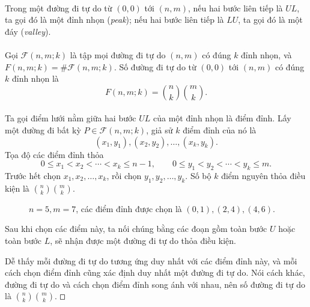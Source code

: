 \documentclass[11pt]{article}
\newcommand{\square}{\mathord{\vcenter{\hrule height .5pt
  \hbox{\vrule width .5pt height 5pt\kern5pt\vrule width .5pt}
  \hrule height .5pt}}}
\begin{document}
\paragraph{}
Trong một đường đi tự do từ \((0,0)\) tới \((n,m)\), nếu hai bước liên tiếp là
\(UL\), ta gọi đó là một đỉnh nhọn (\emph{peak}); nếu hai bước liên tiếp là
\(LU\), ta gọi đó là một đáy (\emph{valley}).

\paragraph{}
Gọi \(\mathcal F(n,m;k)\) là tập mọi đường đi tự do \((n,m)\) có đúng \(k\)
đỉnh nhọn, và \(F(n,m;k)=\#\mathcal F(n,m;k)\). Số đường đi tự do từ \((0,0)\)
tới \((n,m)\) có đúng \(k\) đỉnh nhọn là
\[
  F(n,m;k)=\binom nk\binom mk. \tag{6}
\]

\paragraph{}
Ta gọi điểm lưới nằm giữa hai bước \(UL\) của một đỉnh nhọn là điểm đỉnh. Lấy
một đường đi bất kỳ \(P\in\mathcal F(n,m;k)\), giả sử \(k\) điểm đỉnh của nó
là
\[
  (x_1,y_1),(x_2,y_2),\ldots,(x_k,y_k).
\]
Tọa độ các điểm đỉnh thỏa
\[
  0\le x_1<x_2<\cdots<x_k\le n-1,\qquad
  0\le y_1<y_2<\cdots<y_k\le m.
\]
Trước hết chọn \(x_1,x_2,\ldots,x_k\), rồi chọn \(y_1,y_2,\ldots,y_k\). Số bộ
\(k\) điểm nguyên thỏa điều kiện là \(\binom nk\binom mk\).

\begin{figure}[ht]
\centering
{}
\caption{\(n=5,m=7\), các điểm đỉnh được chọn là
\((0,1),(2,4),(4,6)\).}
\end{figure}

Sau khi chọn các điểm này, ta nối chúng bằng các đoạn gồm toàn bước \(U\) hoặc
toàn bước \(L\), sẽ nhận được một đường đi tự do thỏa điều kiện.

Dễ thấy mỗi đường đi tự do tương ứng duy nhất với các điểm đỉnh này, và mỗi
cách chọn điểm đỉnh cũng xác định duy nhất một đường đi tự do. Nói cách khác,
đường đi tự do và cách chọn điểm đỉnh song ánh với nhau, nên số đường đi tự do
là \(\binom nk\binom mk\). \(\square\)
\end{document}
